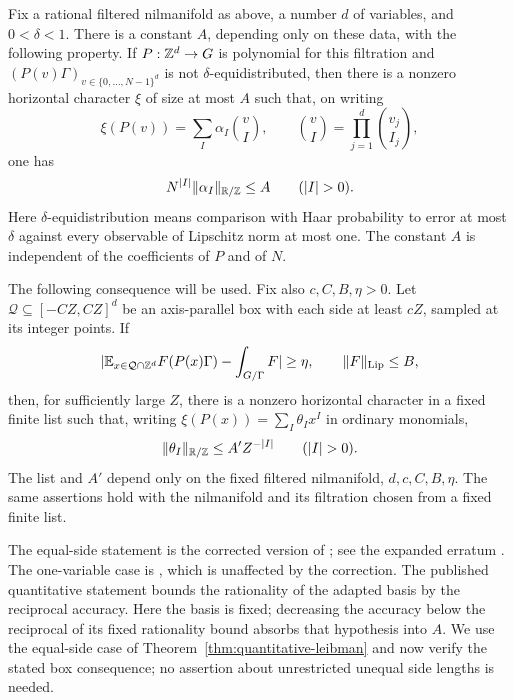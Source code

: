 \begin{theorem}
\label{thm:quantitative-leibman}
Fix a rational filtered nilmanifold as above, a number $d$ of variables,
and $0<\delta<1$.  There is a constant $A$, depending only on these data,
with the following property.  If $P:\mathbb Z^d\to G$ is polynomial for this
filtration and $(P(v)\Gamma)_{v\in\{0,\ldots,N-1\}^d}$ is not
$\delta$-equidistributed, then there is a nonzero horizontal character
$\xi$ of size at most $A$ such that, on writing
\[
 \xi(P(v))=\sum_I\alpha_I\binom vI,
 \qquad \binom vI=\prod_{j=1}^d\binom{v_j}{I_j},
\]
one has
\begin{equation}
 N^{\lvert I\rvert}\lVert\alpha_I\rVert_{\mathbb R/\mathbb Z}\leq A
 \qquad (\lvert I\rvert>0).
 \label{eq:rough-leibman-binomial}
\end{equation}
Here $\delta$-equidistribution means comparison with Haar probability to
error at most $\delta$ against every observable of Lipschitz norm at most
one.  The constant $A$ is independent of the coefficients of $P$ and of
$N$.

The following consequence will be used.  Fix also $c,C,B,\eta>0$.  Let
$\mathcal Q\subseteq[-CZ,CZ]^d$ be an axis-parallel box with each side
at least $cZ$, sampled at its integer points.  If
\begin{equation}
 \lvert\mathbb E_{x\in\mathcal Q\cap\mathbb Z^d}F(P(x)\Gamma)
       -\int_{G/\Gamma}F\rvert\geq\eta,
 \qquad \lVert F\rVert_{\operatorname{Lip}}\leq B,
 \label{eq:rough-haar-obstruction}
\end{equation}
then, for sufficiently large $Z$, there is a nonzero horizontal
character in a fixed finite list such that, writing
$\xi(P(x))=\sum_I\theta_Ix^I$ in ordinary monomials,
\begin{equation}
 \lVert\theta_I\rVert_{\mathbb R/\mathbb Z}\leq A'Z^{-\lvert I\rvert}
 \qquad (\lvert I\rvert>0).
 \label{eq:rough-leibman-monomial}
\end{equation}
The list and $A'$ depend only on the fixed filtered nilmanifold,
$d,c,C,B,\eta$.  The same assertions hold with the nilmanifold and its
filtration chosen from a fixed finite list.
\end{theorem}

The equal-side statement is the corrected version of
\cite[Theorem~8.6]{GreenTao}; see the expanded erratum
\cite[p.~3 and Section~3, arXiv:1311.6170v3]{GreenTaoErratum}.
The one-variable case is
\cite[Theorem~2.9]{GreenTao}, which is unaffected by the correction.
The published quantitative statement bounds the rationality of the
adapted basis by the reciprocal accuracy.  Here the basis is fixed;
decreasing the accuracy below the reciprocal of its fixed rationality
bound absorbs that hypothesis into $A$.
We use the equal-side case of Theorem~\ref{thm:quantitative-leibman}
and now verify the stated box consequence;
no assertion about unrestricted unequal side lengths is needed.

